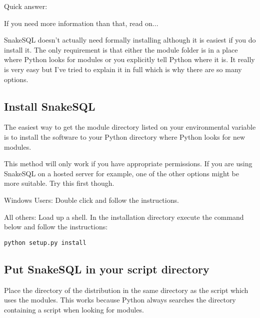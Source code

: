 \documentclass{howto}
\begin{document}
Quick answer: 

If you need more information than that, read on...

SnakeSQL doesn't actually need formally installing although it is easiest if you do install it. The only requirement is that either the  module folder is in a place where Python looks for modules or you explicitly tell Python where it is. It really is very easy but I've tried to explain it in full which is why there are so many options.

\subsection{Install SnakeSQL}

The easiest way to get the  module directory listed on your  environmental variable is to install the software to your Python  directory where Python looks for new modules. 

This method will only work if you have appropriate permissions. If you are using SnakeSQL on a hosted server for example, one of the other options might be more suitable. Try this first though.

Windows Users: Double click  and follow the instructions.

All others: Load up a shell. In the installation directory execute the command below and follow the instructions:
\begin{verbatim}
python setup.py install
\end{verbatim}


\subsection{Put SnakeSQL in your script directory}

Place the  directory of the distribution in the same directory as the script which uses the modules. This works because Python always searches the directory containing a script when looking for modules.

\end{document}

